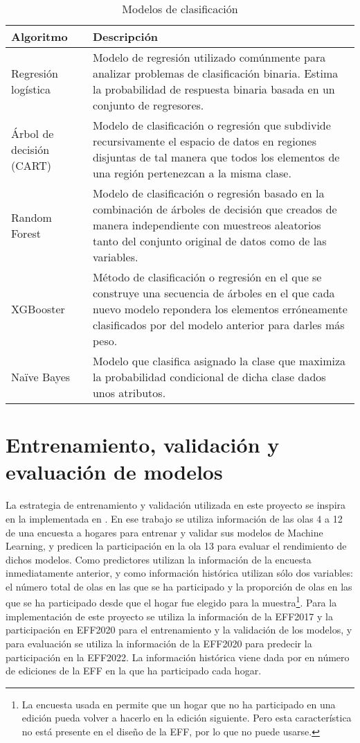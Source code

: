 \begin{table}[htbp]
\centering{}
\begin{tabular}{l p{10cm}}
\hline
\textbf{Algoritmo} & \textbf{Descripción} \\ \hline
Regresión logística & Modelo de regresión utilizado comúnmente para analizar problemas de clasificación binaria. Estima la probabilidad de respuesta binaria basada en un conjunto de regresores. \\ \hline
Árbol de decisión (CART) & Modelo de clasificación o regresión que subdivide recursivamente el espacio de datos en regiones disjuntas de tal manera que todos los elementos de una región pertenezcan a la misma clase. \\ \hline
Random Forest & Modelo de clasificación o regresión basado en la combinación  de árboles de decisión que creados de manera independiente con muestreos aleatorios tanto del conjunto original de datos como de las variables. \\ \hline
XGBooster & Método de clasificación o regresión en el que se construye una secuencia de árboles en el que cada nuevo modelo repondera los elementos erróneamente clasificados por del modelo anterior para darles más peso. \\ \hline
Naïve Bayes & Modelo que clasifica asignado la clase que maximiza la probabilidad condicional de dicha clase dados unos atributos. \\ \hline
\end{tabular}
\caption{Modelos de clasificación}
\label{table:classifiers}
\end{table}

\section{Entrenamiento, validación y evaluación de modelos}

La estrategia de entrenamiento y validación utilizada en este proyecto se inspira en la implementada en \cite{beste2023case}. En ese trabajo se utiliza información de las olas 4 a 12 de una encuesta a hogares para entrenar y validar sus modelos de Machine Learning, y predicen la participación en la ola 13 para evaluar el rendimiento de dichos modelos. Como predictores utilizan la información de la encuesta inmediatamente anterior, y como información histórica utilizan sólo dos variables: el número total de olas en las que se ha participado y la proporción de olas en las que se ha participado desde que el hogar fue elegido para la muestra\footnote{La encuesta usada en \cite{beste2023case} permite que un hogar que no ha participado en una edición pueda volver a hacerlo en la edición siguiente. Pero esta característica no está presente en el diseño de la EFF, por lo que no puede usarse.}. Para la implementación de este proyecto se utiliza la información de la EFF2017 y la participación en EFF2020 para el entrenamiento y la validación de los modelos, y para evaluación se utiliza la información de la EFF2020 para predecir la participación en la EFF2022. La información histórica viene dada por en número de ediciones de la EFF en la que ha participado cada hogar.

